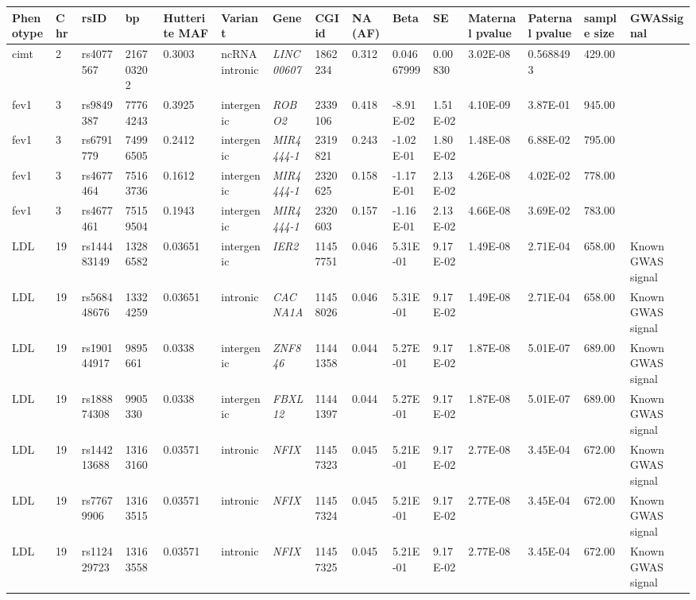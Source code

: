 \begin{landscape}

\begin{table}
\centering
\begin{adjustbox}{max width=\linewidth}
\begin{tabular}{@{}p{2cm}|p{0.5cm}p{2cm}p{2cm}p{1.5cm}p{3cm}p{2.1cm}p{1.5cm}p{1cm}p{2cm}p{2cm}p{2cm}p{2cm}p{1.5cm}p{4cm}@{}}
\toprule Phenotype & Chr & rsID & bp & Hutterite MAF & Variant & Gene & CGI id & NA (AF) & Beta & SE & Maternal pvalue & Paternal pvalue & sample size & GWASsignal \\  \midrule
cimt&2&rs4077567&216703202&0.3003&ncRNA intronic&\emph{LINC00607}&1862234&0.312&0.04667999&0.00830&3.02E-08&0.5688493&429.00& \\ \hline
fev1&3&rs9849387&77764243&0.3925&intergenic&\emph{ROBO2}&2339106&0.418&-8.91E-02&1.51E-02&4.10E-09&3.87E-01&945.00& \\ \hline
fev1&3&rs6791779&74996505&0.2412&intergenic&\emph{MIR4444-1}&2319821&0.243&-1.02E-01&1.80E-02&1.48E-08&6.88E-02&795.00& \\ \hline
fev1&3&rs4677464&75163736&0.1612&intergenic&\emph{MIR4444-1}&2320625&0.158&-1.17E-01&2.13E-02&4.26E-08&4.02E-02&778.00& \\ \hline
fev1&3&rs4677461&75159504&0.1943&intergenic&\emph{MIR4444-1}&2320603&0.157&-1.16E-01&2.13E-02&4.66E-08&3.69E-02&783.00& \\ \hline
LDL&19&rs144483149&13286582&0.03651&intergenic&\emph{IER2}&11457751&0.046&5.31E-01&9.17E-02&1.49E-08&2.71E-04&658.00&Known GWAS signal \\ \hline
LDL&19&rs568448676&13324259&0.03651&intronic&\emph{CACNA1A}&11458026&0.046&5.31E-01&9.17E-02&1.49E-08&2.71E-04&658.00&Known GWAS signal \\ \hline
LDL&19&rs190144917&9895661&0.0338&intergenic&\emph{ZNF846}&11441358&0.044&5.27E-01&9.17E-02&1.87E-08&5.01E-07&689.00&Known GWAS signal \\ \hline
LDL&19&rs188874308&9905330&0.0338&intergenic&\emph{FBXL12}&11441397&0.044&5.27E-01&9.17E-02&1.87E-08&5.01E-07&689.00&Known GWAS signal \\ \hline
LDL&19&rs144213688&13163160&0.03571&intronic&\emph{NFIX}&11457323&0.045&5.21E-01&9.17E-02&2.77E-08&3.45E-04&672.00&Known GWAS signal \\ \hline
LDL&19&rs77679906&13163515&0.03571&intronic&\emph{NFIX}&11457324&0.045&5.21E-01&9.17E-02&2.77E-08&3.45E-04&672.00&Known GWAS signal \\ \hline
LDL&19&rs112429723&13163558&0.03571&intronic&\emph{NFIX}&11457325&0.045&5.21E-01&9.17E-02&2.77E-08&3.45E-04&672.00&Known GWAS signal \\ \hline

\end{tabular}
\end{adjustbox}
\end{table}
\end{landscape}
